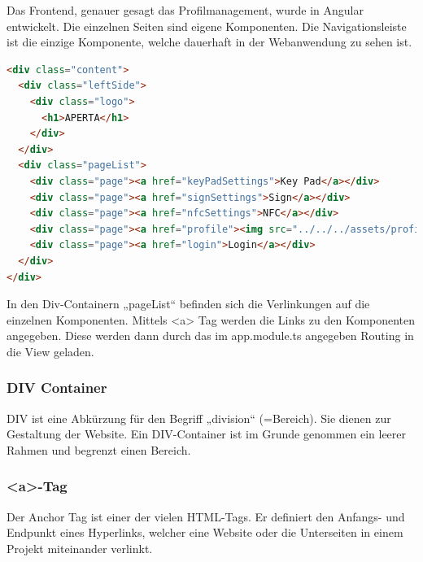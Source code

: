 Das Frontend, genauer gesagt das Profilmanagement, wurde in Angular entwickelt. Die einzelnen Seiten sind eigene Komponenten. Die Navigationsleiste ist die einzige Komponente, welche dauerhaft in der Webanwendung zu sehen ist.

\begin{lstlisting}[language=html, caption=Navigationsleiste Komponente]
    <div class="content">
  <div class="leftSide">
    <div class="logo">
      <h1>APERTA</h1>
    </div>
  </div>
  <div class="pageList">
    <div class="page"><a href="keyPadSettings">Key Pad</a></div>
    <div class="page"><a href="signSettings">Sign</a></div>
    <div class="page"><a href="nfcSettings">NFC</a></div>
    <div class="page"><a href="profile"><img src="../../../assets/profil.png"> </a></div>
    <div class="page"><a href="login">Login</a></div>
  </div>
</div>
\end{lstlisting}

In den Div-Containern „pageList“ befinden sich die Verlinkungen auf die einzelnen Komponenten. Mittels <a> Tag werden die Links zu den Komponenten angegeben. Diese werden dann durch das im app.module.ts angegeben Routing in die View geladen.

\subsubsection{DIV Container}

DIV ist eine Abkürzung für den Begriff „division“ (=Bereich). Sie dienen zur Gestaltung der Website. Ein DIV-Container ist im Grunde genommen ein leerer Rahmen und begrenzt einen Bereich. 
\cite{DivContainer}

\subsubsection{<a>-Tag}
Der Anchor Tag ist einer der vielen HTML-Tags. Er definiert den Anfangs- und Endpunkt eines Hyperlinks, welcher eine Website oder die Unterseiten in einem Projekt miteinander verlinkt.
\cite{ATag}

